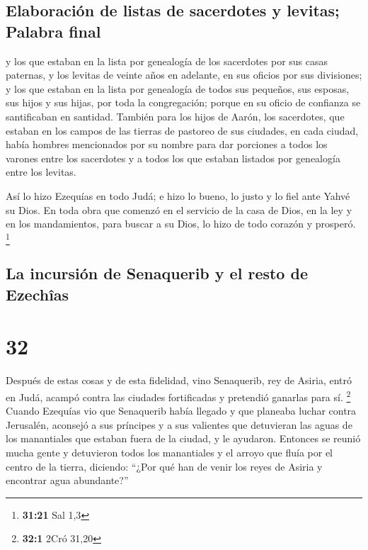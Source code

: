 \hypertarget{elaboraciuxf3n-de-listas-de-sacerdotes-y-levitas-palabra-final}{%
\subsection{Elaboración de listas de sacerdotes y levitas; Palabra
final}\label{elaboraciuxf3n-de-listas-de-sacerdotes-y-levitas-palabra-final}}

 y los que estaban en la lista por genealogía de los
sacerdotes por sus casas paternas, y los levitas de veinte años en
adelante, en sus oficios por sus divisiones;  y los que
estaban en la lista por genealogía de todos sus pequeños, sus esposas,
sus hijos y sus hijas, por toda la congregación; porque en su oficio de
confianza se santificaban en santidad.  También para los
hijos de Aarón, los sacerdotes, que estaban en los campos de las tierras
de pastoreo de sus ciudades, en cada ciudad, había hombres mencionados
por su nombre para dar porciones a todos los varones entre los
sacerdotes y a todos los que estaban listados por genealogía entre los
levitas.

 Así lo hizo Ezequías en todo Judá; e hizo lo bueno, lo
justo y lo fiel ante Yahvé su Dios.  En toda obra que
comenzó en el servicio de la casa de Dios, en la ley y en los
mandamientos, para buscar a su Dios, lo hizo de todo corazón y prosperó.
\footnote{\textbf{31:21} Sal 1,3}

\hypertarget{la-incursiuxf3n-de-senaquerib-y-el-resto-de-ezechuxeeas}{%
\subsection{La incursión de Senaquerib y el resto de
Ezechîas}\label{la-incursiuxf3n-de-senaquerib-y-el-resto-de-ezechuxeeas}}

\hypertarget{section-31}{%
\section{32}\label{section-31}}

 Después de estas cosas y de esta fidelidad, vino
Senaquerib, rey de Asiria, entró en Judá, acampó contra las ciudades
fortificadas y pretendió ganarlas para sí. \footnote{\textbf{32:1} 2Cró
  31,20}  Cuando Ezequías vio que Senaquerib había llegado
y que planeaba luchar contra Jerusalén,  aconsejó a sus
príncipes y a sus valientes que detuvieran las aguas de los manantiales
que estaban fuera de la ciudad, y le ayudaron.  Entonces
se reunió mucha gente y detuvieron todos los manantiales y el arroyo que
fluía por el centro de la tierra, diciendo: ``¿Por qué han de venir los
reyes de Asiria y encontrar agua abundante?''

